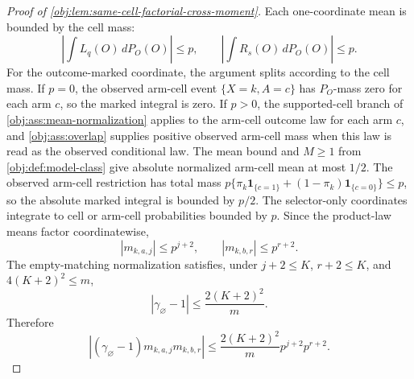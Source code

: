 \begin{proof}[Proof of \cref{obj:lem:same-cell-factorial-cross-moment}]
Each one-coordinate mean is bounded by the cell mass:
\[
\left|\int L_q(O)\,dP_O(O)\right|\le p,
\qquad
\left|\int R_s(O)\,dP_O(O)\right|\le p.
\]
For the outcome-marked coordinate, the argument splits according to the cell mass. If \(p=0\), the observed arm-cell event \(\{X=k,A=c\}\) has \(P_O\)-mass zero for each arm \(c\), so the marked integral is zero. If \(p>0\), the supported-cell branch of \cref{obj:ass:mean-normalization} applies to the arm-cell outcome law for each arm \(c\), and \cref{obj:ass:overlap} supplies positive observed arm-cell mass when this law is read as the observed conditional law. The mean bound and \(M\ge1\) from \cref{obj:def:model-class} give absolute normalized arm-cell mean at most \(1/2\). The observed arm-cell restriction has total mass
\(p\{\pi_k\mathbf 1_{\{c=1\}}+(1-\pi_k)\mathbf 1_{\{c=0\}}\}\le p\), so the absolute marked integral is bounded by \(p/2\). The selector-only coordinates integrate to cell or arm-cell probabilities bounded by \(p\). Since the product-law means factor coordinatewise,
\[
|m_{k,a,j}|\le p^{j+2},
\qquad
|m_{k,b,r}|\le p^{r+2}.
\]
The empty-matching normalization satisfies, under \(j+2\le K\), \(r+2\le K\), and \(4(K+2)^2\le m\),
\[
|\gamma_\varnothing-1|
\le
\frac{2(K+2)^2}{m}.
\]
Therefore
\[
|(\gamma_\varnothing-1)m_{k,a,j}m_{k,b,r}|
\le
\frac{2(K+2)^2}{m}p^{j+2}p^{r+2}.
\]


\end{proof}
